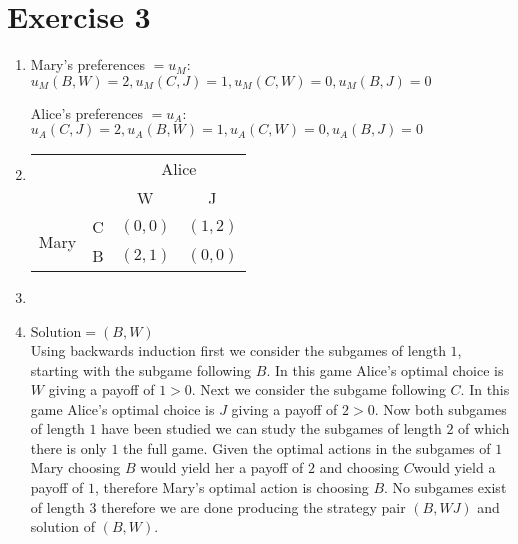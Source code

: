 \documentclass[]{article}
\begin{document}
\section*{Exercise 3}
\begin{enumerate}
	\item
	Mary's preferences $=u_M$: \\
	$u_M(B,W)=2, u_M(C,J)=1, u_M(C,W)=0, u_M(B,J)=0$\par
	Alice's preferences $=u_A$:\\
	$u_A(C,J)=2, u_A(B,W)=1, u_A(C,W)=0, u_A(B,J)=0$
	\item
	\begin{tabular}[t]{c c | c c}
		 \multicolumn{2}{c}{}& \multicolumn{2}{c}{Alice} \\
		& & W & J \\
		\cline{2-4}
		\multirow{2}{4ex}{Mary} & C & $(0,0)$ & $(1,2)$\\
		& B & $(2,1)$ & $(0,0)$
	\end{tabular}
	\item
	~\\
	\item
	$\text{Solution}=(B,W)$\\
	Using backwards induction first we consider the subgames of length $1$, starting with the subgame following $B$. In this game Alice's optimal choice is $W$ giving a payoff of $1>0$. Next we consider the subgame following $C$. In this game Alice's optimal choice is $J$ giving a payoff of $2>0$. Now both subgames of length $1$ have been studied we can study the subgames of length $2$ of which there is only $1$ the full game. Given the optimal actions in the subgames of $1$  Mary choosing $B$ would yield her a payoff of $2$ and choosing $C$would yield a payoff of $1$, therefore Mary's optimal action is choosing $B$. No subgames exist of length $3$ therefore we are done producing the strategy pair $(B,WJ)$ and solution of $(B,W)$.
\end{enumerate}
\end{document}
